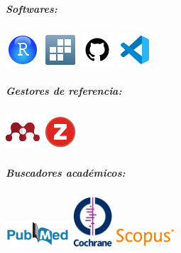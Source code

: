\documentclass[
  letterpaper,
  DIV=11,
  numbers=noendperiod]{scrartcl}
\let\oldsubparagraph\subparagraph
\renewcommand{\subparagraph}[1]{\oldsubparagraph{#1}\mbox{}}
\begin{document}
\hypertarget{softwares}{%
\subparagraph{\texorpdfstring{\emph{Softwares:}}{Softwares:}}\label{softwares}}

\includegraphics{images/rstudio-icon.png}
\includegraphics{images/stata-icon.png}
\includegraphics{images/github-icon.png}
\includegraphics{images/vscode-icon.png}

\hypertarget{gestores-de-referencia}{%
\subparagraph{\texorpdfstring{\emph{Gestores de
referencia:}}{Gestores de referencia:}}\label{gestores-de-referencia}}

\includegraphics{images/mendeley-icon.png}
\includegraphics{images/zotero-icon.png}

\hypertarget{buscadores-acaduxe9micos}{%
\subparagraph{\texorpdfstring{\emph{Buscadores
académicos:}}{Buscadores académicos:}}\label{buscadores-acaduxe9micos}}

\includegraphics[width=0.9375in,height=\textheight]{images/pubmed-icon.jpg}
\includegraphics[width=0.57292in,height=\textheight]{images/cochrane-icon.png}
\includegraphics[width=0.88542in,height=\textheight]{images/scopus-icon.png}
\end{document}
